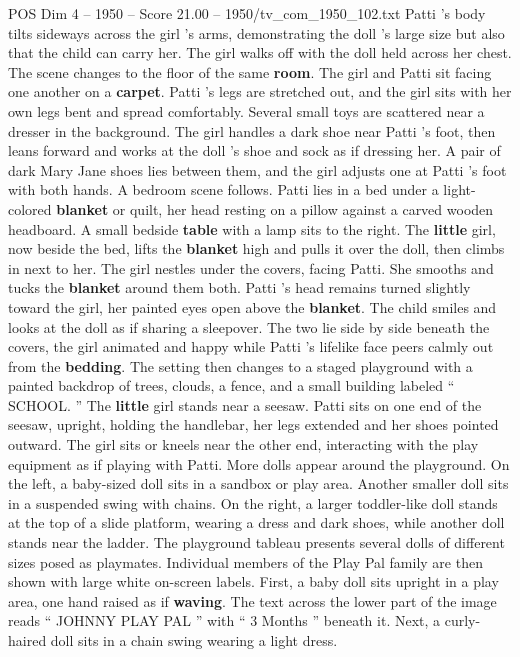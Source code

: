 \begin{textsample}{POS Dim 4 – 1950 – Score 21.00 – 1950/tv\_com\_1950\_102.txt}
Patti ’s body tilts sideways across the girl ’s arms, demonstrating the doll ’s large size but also that the child can carry her.
The girl walks off with the doll held across her chest.
The scene changes to the floor of the same \textbf{room}.
The girl and Patti sit facing one another on a \textbf{carpet}.
Patti ’s legs are stretched out, and the girl sits with her own legs bent and spread comfortably.
Several small toys are scattered near a dresser in the background.
The girl handles a dark shoe near Patti ’s foot, then leans forward and works at the doll ’s shoe and sock as if dressing her.
A pair of dark Mary Jane shoes lies between them, and the girl adjusts one at Patti ’s foot with both hands.
A bedroom scene follows.
Patti lies in a bed under a light-colored \textbf{blanket} or quilt, her head resting on a pillow against a carved wooden headboard.
A small bedside \textbf{table} with a lamp sits to the right.
The \textbf{little} girl, now beside the bed, lifts the \textbf{blanket} high and pulls it over the doll, then climbs in next to her.
The girl nestles under the covers, facing Patti.
She smooths and tucks the \textbf{blanket} around them both.
Patti ’s head remains turned slightly toward the girl, her painted eyes open above the \textbf{blanket}.
The child smiles and looks at the doll as if sharing a sleepover.
The two lie side by side beneath the covers, the girl animated and happy while Patti ’s lifelike face peers calmly out from the \textbf{bedding}.
The setting then changes to a staged playground with a painted backdrop of trees, clouds, a fence, and a small building labeled “ SCHOOL. ” The \textbf{little} girl stands near a seesaw.
Patti sits on one end of the seesaw, upright, holding the handlebar, her legs extended and her shoes pointed outward.
The girl sits or kneels near the other end, interacting with the play equipment as if playing with Patti.
More dolls appear around the playground.
On the left, a baby-sized doll sits in a sandbox or play area.
Another smaller doll sits in a suspended swing with chains.
On the right, a larger toddler-like doll stands at the top of a slide platform, wearing a dress and dark shoes, while another doll stands near the ladder.
The playground tableau presents several dolls of different sizes posed as playmates.
Individual members of the Play Pal family are then shown with large white on-screen labels.
First, a baby doll sits upright in a play area, one hand raised as if \textbf{waving}.
The text across the lower part of the image reads “ JOHNNY PLAY PAL ” with “ 3 Months ” beneath it.
Next, a curly-haired doll sits in a chain swing wearing a light dress.

\end{textsample}
